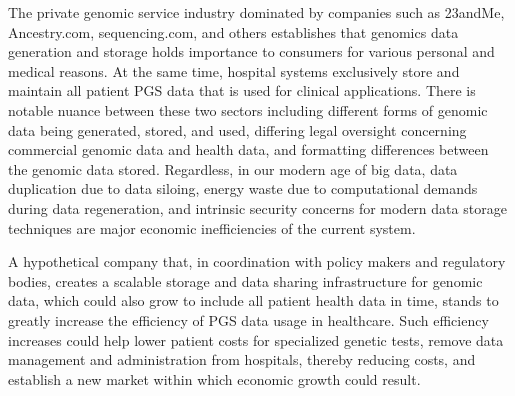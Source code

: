 \documentclass[a4paper,11pt]{article}
\begin{document}
\begin{refsection}
The private genomic service industry dominated by companies such as 23andMe, Ancestry.com, sequencing.com, and others establishes that genomics data generation and storage holds importance to consumers for various personal and medical reasons. 
At the same time, hospital systems exclusively store and maintain all patient PGS data that is used for clinical applications. 
There is notable nuance between these two sectors including different forms of genomic data being generated, stored, and used, differing legal oversight concerning commercial genomic data and health data, and formatting differences between the genomic data stored. 
Regardless, in our modern age of big data, data duplication due to data siloing, energy waste due to computational demands during data regeneration, and intrinsic security concerns for modern data storage techniques are major economic inefficiencies of the current system. 

A hypothetical company that, in coordination with policy makers and regulatory bodies, creates a scalable storage and data sharing infrastructure for genomic data, which could also grow to include all patient health data in time, stands to greatly increase the efficiency of PGS data usage in healthcare. 
Such efficiency increases could help lower patient costs for specialized genetic tests, remove data management and administration from hospitals, thereby reducing costs, and establish a new market within which economic growth could result. 


\end{refsection}
\end{document}
